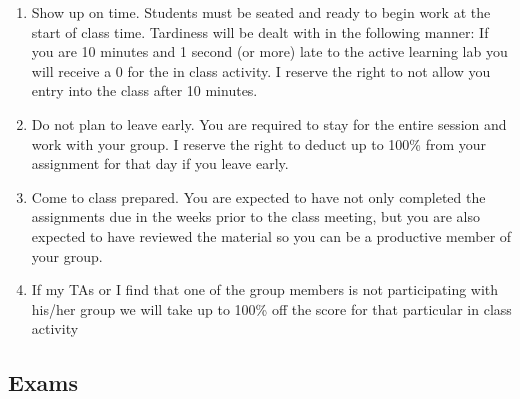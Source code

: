 \documentclass[11pt]{paper}
\begin{document}
\begin{itemize}
\begin{enumerate}
\item Show up on time. Students must be seated and ready to begin work at the start of class time. Tardiness will be dealt with in the following manner: If you are 10 minutes and 1 second (or more) late to the active learning lab you will receive a 0 for the in class activity. I reserve the right to not allow you entry into the class after 10 minutes.
\item Do not plan to leave early. You are required to stay for the entire session and work with your group. I reserve the right to deduct up to 100\% from your assignment for that day if you leave early.
\item Come to class prepared. You are expected to have not only completed the assignments due in the weeks prior to the class meeting, but you are also expected to have reviewed the material so you can be a productive member of your group.
\item If my TAs or I find that one of the group members is not participating with his/her group we will take up to 100\% off the score for that particular in class activity
\end{enumerate}
\end{itemize}

\subsection{Exams}
\end{document}
